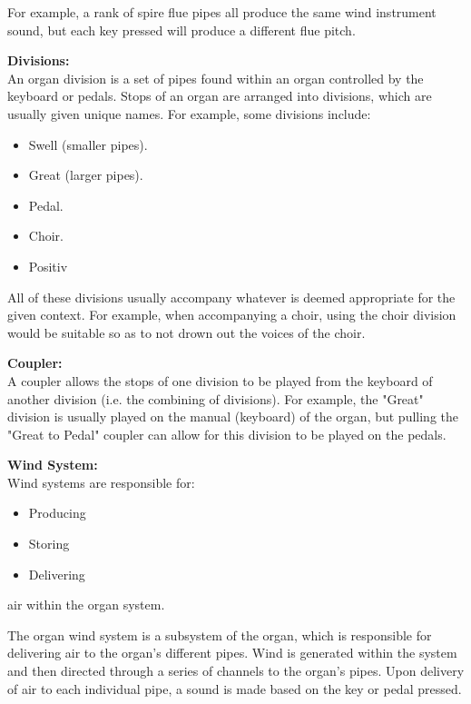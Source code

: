 For example, a rank of spire flue pipes all produce the same wind instrument sound, but each key pressed will produce a different flue pitch.  \cite{organvideo}

\medskip
\noindent \textbf{Divisions:}
\\ \hspace*{0.5cm} An organ division is a set of pipes found within an organ controlled by the keyboard or pedals. Stops of an organ are arranged into divisions, which are usually given unique names. For example, some divisions include:
\begin{itemize}
    \itemsep0em 
\item Swell (smaller pipes).
\item Great (larger pipes).
\item Pedal.
\item Choir.
\item Positiv
\end{itemize}

All of these divisions usually accompany whatever is deemed appropriate for the given context. For example, when accompanying a choir, using the choir division would be suitable so as to not drown out the voices of the choir. \cite{organvideo}

\medskip
\noindent \textbf{Coupler:}
\\ \hspace*{0.5cm} A coupler allows the stops of one division to be played from the keyboard of another division (i.e. the combining of divisions). For example, the "Great" division is usually played on the manual (keyboard) of the organ, but pulling the "Great to Pedal" coupler can allow for this division to be played on the pedals. \cite{organvideo}

\medskip
\noindent \textbf{Wind System:}
\\ \hspace*{0.5cm} Wind systems are responsible for:
\begin{itemize}
    \itemsep0em 
\item Producing
\item Storing
\item Delivering
\end{itemize}
air within the organ system.

The organ wind system is a subsystem of the organ, which is responsible for delivering air to the organ's different pipes. Wind is generated within the system and then directed through a series of channels to the organ's pipes. Upon delivery of air to each individual pipe, a sound is made based on the key or pedal pressed. \cite{organvideo}

